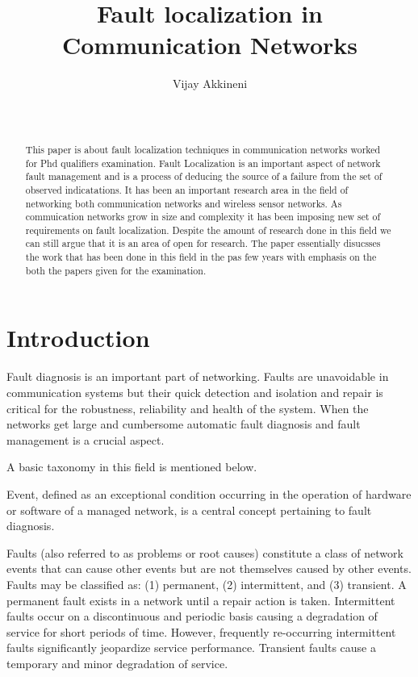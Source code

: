 \documentclass[10pt]{sigplan-proc-varsize}
\author{
%
\alignauthor Vijay Akkineni \\
        \affaddr{Department of Computer Science and Engineering}\\
        \affaddr{Georgia State University}\\
       \email{vakkineni1@student.gsu.edu}
}
\title{Fault localization in Communication Networks}
\begin{document}
\maketitle

\begin{abstract}
This paper is about fault localization techniques in communication networks worked for Phd qualifiers examination. 
Fault Localization is an important aspect of network fault management and is a process of deducing the source of a failure from the set of observed indicatations. 
It has been an important research area in the field of networking both communication networks and wireless sensor networks.
As commuication networks grow in size and complexity it has been imposing new set of requirements on fault localization. 
Despite the amount of research done in this field we can still argue that it is an area of open for research. 
The paper essentially disucsses the work that has been done in this field in the pas few years with emphasis on the both the papers given for the examination.
\end{abstract}



\section{Introduction}
  \label{sec:intro}

Fault diagnosis is an important part of networking. Faults are unavoidable in communication systems but their quick detection and isolation and repair is critical 
for the robustness, reliability and health of the system. When the networks get large and cumbersome automatic fault diagnosis and fault management is a crucial aspect.

A basic taxonomy in this field is mentioned below.

Event, defined as an exceptional condition occurring in the operation of hardware or software of a managed network, is a central concept pertaining to fault diagnosis.

Faults (also referred to as problems or root causes) constitute a class of network events that can cause other events but are not themselves caused by other 
events. Faults may be classified as: (1) permanent, (2) intermittent, and (3) transient. A permanent fault exists in a network until a repair action is taken.
Intermittent faults occur on a discontinuous and periodic basis causing a degradation of service for short periods of time.
However, frequently re-occurring intermittent faults significantly jeopardize service performance. 
Transient faults cause a temporary and minor degradation of service.
\end{document}
